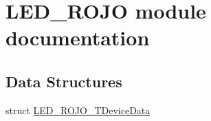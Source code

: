 \hypertarget{group___l_e_d___r_o_j_o__module}{}\section{L\+E\+D\+\_\+\+R\+O\+JO module documentation}
\label{group___l_e_d___r_o_j_o__module}
\subsection*{Data Structures}
\begin{DoxyCompactItemize}
\item 
struct \hyperlink{struct_l_e_d___r_o_j_o___t_device_data}{L\+E\+D\+\_\+\+R\+O\+J\+O\+\_\+\+T\+Device\+Data}
\end{DoxyCompactItemize}
